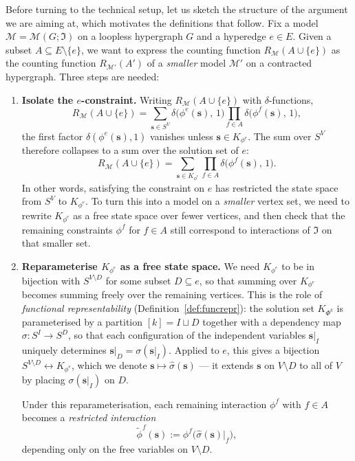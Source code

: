 \documentclass[11pt,reqno]{amsart}
\newcommand{\vecs}{\boldsymbol{s}}
\newcommand{\Mo}{\mathcal{M}}
\newcommand{\IFam}{\mathfrak{I}}
\theoremstyle{plain}
\theoremstyle{definition}
\numberwithin{equation}{section}
\begin{document}
Before turning to the technical setup, let us sketch the structure of the argument we are aiming at, which motivates the definitions that follow. Fix a model $\Mo = \Mo(G; \IFam)$ on a loopless hypergraph $G$ and a hyperedge $e \in E$. Given a subset $A \subseteq E \setminus \{e\}$, we want to express the counting function $R_{\Mo}(A \cup \{e\})$ as the counting function $R_{\Mo'}(A')$ of a \emph{smaller} model $\Mo'$ on a contracted hypergraph. Three steps are needed:
\begin{enumerate}
    \item \textbf{Isolate the $e$-constraint.} Writing $R_{\Mo}(A \cup \{e\})$ with $\delta$-functions,
    \[
        R_{\Mo}(A \cup \{e\})
        = \sum_{\vecs \in S^V} \delta\big(\phi^e(\vecs),\, 1\big) \prod_{f \in A} \delta\big(\phi^f(\vecs),\, 1\big),
    \]
    the first factor $\delta(\phi^e(\vecs), 1)$ vanishes unless $\vecs \in K_{\phi^e}$. The sum over $S^V$ therefore collapses to a sum over the solution set of $e$:
    \[
        R_{\Mo}(A \cup \{e\}) = \sum_{\vecs \in K_{\phi^e}} \prod_{f \in A} \delta\big(\phi^f(\vecs),\, 1\big).
    \]
    In other words, satisfying the constraint on $e$ has restricted the state space from $S^V$ to $K_{\phi^e}$. To turn this into a model on a \emph{smaller} vertex set, we need to rewrite $K_{\phi^e}$ as a free state space over fewer vertices, and then check that the remaining constraints $\phi^f$ for $f \in A$ still correspond to interactions of $\IFam$ on that smaller set.

    \item \textbf{Reparameterise $K_{\phi^e}$ as a free state space.} We need $K_{\phi^e}$ to be in bijection with $S^{V \setminus D}$ for some subset $D \subseteq e$, so that summing over $K_{\phi^e}$ becomes summing freely over the remaining vertices. This is the role of \emph{functional representability} (Definition~\ref{def:funcrepr}): the solution set $K_{\Phi^k}$ is parameterised by a partition $[k] = I \sqcup D$ together with a dependency map $\sigma \colon S^I \to S^D$, so that each configuration of the independent variables $\vecs|_I$ uniquely determines $\vecs|_D = \sigma(\vecs|_I)$. Applied to $e$, this gives a bijection $S^{V \setminus D} \leftrightarrow K_{\phi^e}$, which we denote $\vecs \mapsto \hat\sigma(\vecs)$ — it extends $\vecs$ on $V \setminus D$ to all of $V$ by placing $\sigma(\vecs|_I)$ on $D$.

    Under this reparameterisation, each remaining interaction $\phi^f$ with $f \in A$ beco\-mes a \emph{restricted interaction}
    \[
        \widetilde\phi^f(\vecs) := \phi^f\!\big(\hat\sigma(\vecs)|_f\big),
    \]
    depending only on the free variables on $V \setminus D$.


\end{enumerate}
\end{document}
